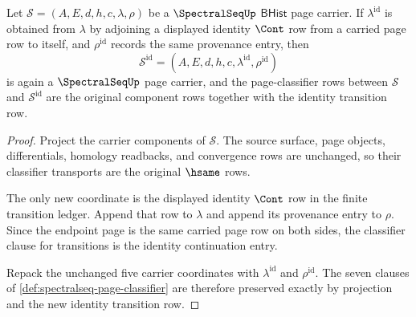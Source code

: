 \begin{theorem}
\label{thm:spectralseq-identity-transition-ledger}
Let $\mathcal S=(A,E,d,h,c,\lambda,\rho)$ be a $\SpectralSeqUp$
$\mathsf{BHist}$ page carrier. If $\lambda^{\mathrm{id}}$ is obtained from
$\lambda$ by adjoining a displayed identity $\Cont$ row from a carried page row
to itself, and $\rho^{\mathrm{id}}$ records the same provenance entry, then
$$
\mathcal S^{\mathrm{id}}=(A,E,d,h,c,\lambda^{\mathrm{id}},\rho^{\mathrm{id}})
$$
is again a $\SpectralSeqUp$ page carrier, and the page-classifier rows between
$\mathcal S$ and $\mathcal S^{\mathrm{id}}$ are the original component rows
together with the identity transition row.
\end{theorem}
\begin{proof}
Project the carrier components of $\mathcal S$. The source surface, page
objects, differentials, homology readbacks, and convergence rows are unchanged,
so their classifier transports are the original $\hsame$ rows.

The only new coordinate is the displayed identity $\Cont$ row in the finite
transition ledger. Append that row to $\lambda$ and append its provenance entry
to $\rho$. Since the endpoint page is the same carried page row on both sides,
the classifier clause for transitions is the identity continuation entry.

Repack the unchanged five carrier coordinates with
$\lambda^{\mathrm{id}}$ and $\rho^{\mathrm{id}}$. The seven clauses of
\autoref{def:spectralseq-page-classifier} are therefore preserved exactly by
projection and the new identity transition row.
\end{proof}

